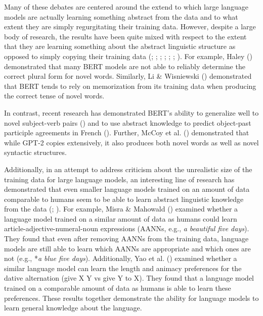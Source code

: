 \documentclass[
  12pt,
  letterpaper,
]{scrreprt}
\begin{document}
Many of these debates are centered around the extend to which large
language models are actually learning something abstract from the data
and to what extent they are simply regurgitating their training data.
However, despite a large body of research, the results have been quite
mixed with respect to the extent that they are learning something about
the abstract linguistic structure as opposed to simply copying their
training data (;
;
;
;
;
;
). For
example, Haley () demonstrated
that many BERT models are not able to reliably determine the correct
plural form for novel words. Similarly, Li \& Wisniewski
() demonstrated that BERT
tends to rely on memorization from its training data when producing the
correct tense of novel words.

In contrast, recent research has demonstrated BERT's ability to
generalize well to novel subject-verb pairs
() and
to use abstract knowledge to predict object-past participle agreements
in French (). Further, McCoy et al.
() demonstrated that while
GPT-2 copies extensively, it also produces both novel words as well as
novel syntactic structures.

Additionally, in an attempt to address criticism about the unrealistic
size of the training data for large language models, an interesting line
of research has demonstrated that even smaller language models trained
on an amount of data comparable to humans seem to be able to learn
abstract linguistic knowledge from the data
(;
). For
example, Misra \& Mahowald
() examined whether a
language model trained on a similar amount of data as humans could learn
article-adjective-numeral-noun expressions (AANNs, e.g., \emph{a
beautiful five days}). They found that even after removing AANNs from
the training data, language models are still able to learn which AANNs
are appropriate and which ones are not (e.g., *\emph{a blue five days}).
Additionally, Yao et al.
() examined whether a
similar language model can learn the length and animacy preferences for
the dative alternation (give X Y vs give Y to X). They found that a
language model trained on a comparable amount of data as humans is able
to learn these preferences. These results together demonstrate the
ability for language models to learn general knowledge about the
language.
\end{document}
